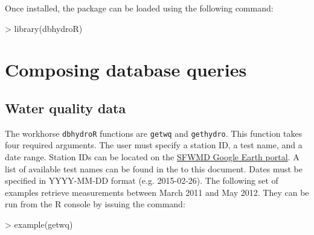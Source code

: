 \documentclass[12pt,notitlepage]{article}
\begin{document}
Once installed, the package can be loaded using the following command:



\begin{Schunk}
\begin{Sinput}
> library(dbhydroR)
\end{Sinput}
\end{Schunk}



\section{Composing database queries}
\subsection{Water quality data}

The workhorse \texttt{dbhydroR} functions are \verb|getwq| and \texttt{gethydro}. This function takes four required arguments. The user must specify a station ID, a test name, and a date range. Station IDs can be located on the \href{http://my.sfwmd.gov/KMLEXT/CUSTOMKMLS/DBHydro/DBHydroKML/DBHYDRO_KML.kmz}{SFWMD Google Earth portal}. A list of available test names can be found in the  to this document. Dates must be specified in YYYY-MM-DD format (e.g. 2015-02-26).   The following set of examples retrieve measurements between March 2011 and May 2012. They can be run from the R console by issuing the command:

\begin{Schunk}
\begin{Sinput}
> example(getwq)
\end{Sinput}
\end{Schunk}
\end{document}
